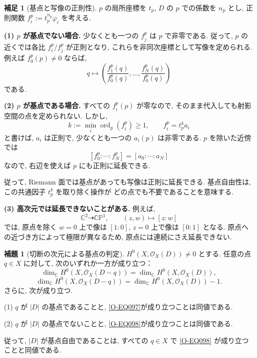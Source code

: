 \documentclass[dvipdfmx,a4paper,11pt]{article} %
\newcommand{\C}{\mathbb{C}}
\theoremstyle{definition}
\numberwithin{equation}{section}
\newtheorem{lem}[thm]{補題}
\newtheorem{rem}[thm]{補足}
\begin{document}
\begin{rem}[基点と写像の正則性]\label{O-M330}
$p$ の局所座標を $t_p$, $D$ の $p$ での係数を $n_p$ とし,
正則関数 $f_i^p:=t_p^{n_p}\varphi_i$ を考える.

\medskip
\noindent
\textbf{(1) $p$ が基点でない場合.}
少なくとも一つの $f_j^p$ は $p$ で非零である.
従って, $p$ の近くでは各比 $f_i^p/f_j^p$ が正則となり,
これらを非同次座標として写像を定められる.
例えば $f_0^p(p)\neq0$ ならば,
\[
q\longmapsto
\left(\frac{f_1^p(q)}{f_0^p(q)},\ldots,
\frac{f_N^p(q)}{f_0^p(q)}\right)
\]
である.

\medskip
\noindent
\textbf{(2) $p$ が基点である場合.}
すべての $f_i^p(p)$ が零なので,
そのまま代入しても射影空間の点を定められない.
しかし,
\[
k:=\min_i\operatorname{ord}_p(f_i^p)\geq1,\qquad
f_i^p=t_p^k a_i
\]
と書けば, $a_i$ は正則で,
少なくとも一つの $a_i(p)$ は非零である.
$p$ を除いた近傍では
\[
[f_0^p:\cdots:f_N^p]=[a_0:\cdots:a_N]
\]
なので, 右辺を使えば $p$ にも正則に延長できる.

従って, Riemann 面では基点があっても写像は正則に延長できる.
基点自由性は, この共通因子 $t_p^k$ を取り除く操作が
どの点でも不要であることを意味する.

\medskip
\noindent
\textbf{(3) 高次元では延長できないことがある.}
例えば,
\[
\C^2\dashrightarrow\C\mathbb P^1,\qquad
(z,w)\longmapsto[z:w]
\]
では, 原点を除く $w=0$ 上で像は $[1:0]$,
$z=0$ 上で像は $[0:1]$ となる.
原点への近づき方によって極限が異なるため,
原点には連続にさえ延長できない.
\end{rem}


\begin{lem}[切断の次元による基点の判定]\label{O-M332}
$H^0(X,\mathcal O_X(D))\neq0$ とする.
任意の点 $q\in X$ に対して, 次のいずれか一方が成り立つ：
\begin{equation}\label{O-EQ097}
\dim_{\C}H^0(X,\mathcal O_X(D-q))
=\dim_{\C}H^0(X,\mathcal O_X(D)),
\end{equation}
\begin{equation}\label{O-EQ098}
\dim_{\C}H^0(X,\mathcal O_X(D-q))
=\dim_{\C}H^0(X,\mathcal O_X(D))-1.
\end{equation}
さらに, 次が成り立つ.

\smallskip
\noindent
(1) $q$ が $|D|$ の基点であることと,
\eqref{O-EQ097}が成り立つことは同値である.

\smallskip
\noindent
(2) $q$ が $|D|$ の基点でないことと,
\eqref{O-EQ098}が成り立つことは同値である.

\smallskip
従って, $|D|$ が基点自由であることは,
すべての $q\in X$ で \eqref{O-EQ098} が成り立つことと同値である.
\end{lem}
\end{document}
